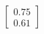 \documentclass[preview]{standalone}
\begin{document}
\begin{align*}
\begin{bmatrix} 0.75 \\ 0.61 \end{bmatrix}
\end{align*}
\end{document}
